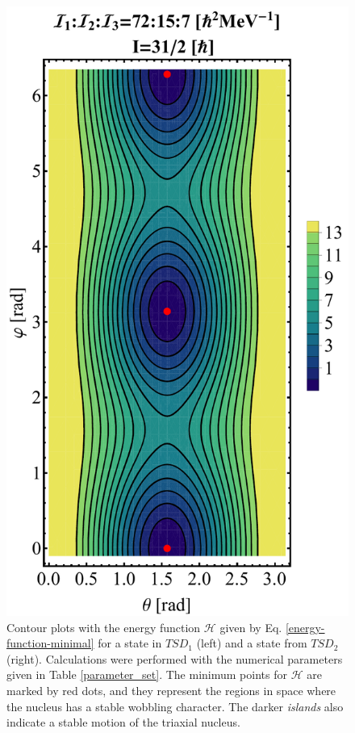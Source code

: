\documentclass[myclassdoc,debug]{rjparticle}
\begin{document}
\begin{figure}
\begin{minipage}{.5\textwidth}
\end{minipage}%
\begin{minipage}{.5\textwidth}
  \centering
 \includegraphics[scale=0.2]{figs/contour-tsd2.pdf}
\end{minipage}
\caption{Contour plots with the energy function $\mathcal{H}$ given by Eq. \ref{energy-function-minimal} for a state in $TSD_1$ (left) and a state from $TSD_2$ (right). Calculations were performed with the numerical parameters given in Table \ref{parameter_set}. The minimum points for $\mathcal{H}$ are marked by red dots, and they represent the regions in space where the nucleus has a stable wobbling character. The darker \emph{islands} also indicate a stable motion of the triaxial nucleus.}
    \label{contours-12}
\end{figure}
\end{document}
